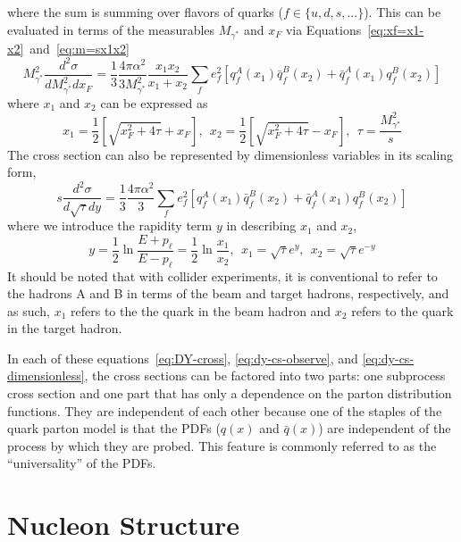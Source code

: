where the sum is summing over flavors of quarks ($f\in\{u,d,s,...\}$). This can be evaluated in terms of the measurables $M_{\gamma^*}$ and $x_F$ via Equations~\ref{eq:xf=x1-x2}~and~\ref{eq:m=sx1x2}
\begin{equation}
M_{\gamma^*}^2 \frac{d^2\sigma}{dM_{\gamma^*}^2 dx_F} = 
\frac{1}{3}\frac{4\pi\alpha^2}{3M_{\gamma^*}^2}
\frac{x_1 x_2}{x_1 + x_2}
\sum_{f}e_f^2[q_f^A(x_1)\bar{q}_f^B(x_2)+
\bar{q}_f^A(x_1)q_f^B(x_2)]
\label{eq:dy-cs-observe}
\end{equation}
where $x_1$ and $x_2$ can be expressed as
\begin{equation}
x_1 = \frac{1}{2}\left[\sqrt{x_F^2 + 4\tau} + x_F\right],\ \  
x_2 = \frac{1}{2}\left[\sqrt{x_F^2 + 4\tau} - x_F\right],\ \ 
\tau = \frac{M_{\gamma^*}^2}{s} \label{eq:x1-x2-tau}
\end{equation}
The cross section can also be represented by dimensionless variables in its scaling form,
\begin{equation}
s \frac{d^2\sigma}{d \sqrt{\tau} dy} = 
\frac{1}{3}\frac{4\pi\alpha^2}{3}
\sum_{f}e_f^2[q_f^A(x_1)\bar{q}_f^B(x_2)+
\bar{q}_f^A(x_1)q_f^B(x_2)]
\label{eq:dy-cs-dimensionless}
\end{equation}
where we introduce the rapidity term $y$ in describing $x_1$ and $x_2$,
\begin{equation}
y  = \frac{1}{2} \ln \frac{E+ p_\ell}{E-p_\ell} = \frac{1}{2} \ln \frac{x_1}{x_2},\ \ 
x_1  = \sqrt{\tau} e^{y},\ \  
x_2  = \sqrt{\tau} e^{-y}
\end{equation}
It should be noted that with collider experiments, it is conventional to refer to the hadrons A and B in terms of the beam and target hadrons, respectively, and as such, $x_1$ refers to the the quark in the beam hadron and $x_2$ refers to the quark in the target hadron.

In each of these equations~\ref{eq:DY-cross}, \ref{eq:dy-cs-observe}, and \ref{eq:dy-cs-dimensionless}, the cross sections can be factored into two parts: one subprocess cross section and one part that has only a dependence on the parton distribution functions. They are independent of each other because one of the staples of the quark parton model is that the PDFs ($q(x)$ and $\bar{q}(x)$) are independent of the process by which they are probed. This feature is commonly referred to as the ``universality'' of the PDFs.

\section{Nucleon Structure}

